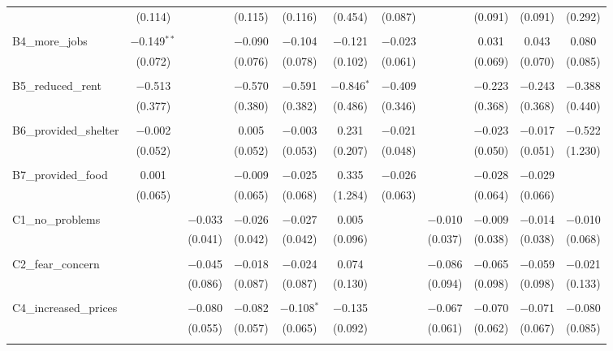 \begin{table}[H]
\begin{tabular}{@{\extracolsep{4pt}}lcccccccccc}
  & (0.114) &  & (0.115) & (0.116) & (0.454) & (0.087) &  & (0.091) & (0.091) & (0.292) \\ 
  & & & & & & & & & & \\ 
 B4\_more\_jobs & $-$0.149$^{**}$ &  & $-$0.090 & $-$0.104 & $-$0.121 & $-$0.023 &  & 0.031 & 0.043 & 0.080 \\ 
  & (0.072) &  & (0.076) & (0.078) & (0.102) & (0.061) &  & (0.069) & (0.070) & (0.085) \\ 
  & & & & & & & & & & \\ 
 B5\_reduced\_rent & $-$0.513 &  & $-$0.570 & $-$0.591 & $-$0.846$^{*}$ & $-$0.409 &  & $-$0.223 & $-$0.243 & $-$0.388 \\ 
  & (0.377) &  & (0.380) & (0.382) & (0.486) & (0.346) &  & (0.368) & (0.368) & (0.440) \\ 
  & & & & & & & & & & \\ 
 B6\_provided\_shelter & $-$0.002 &  & 0.005 & $-$0.003 & 0.231 & $-$0.021 &  & $-$0.023 & $-$0.017 & $-$0.522 \\ 
  & (0.052) &  & (0.052) & (0.053) & (0.207) & (0.048) &  & (0.050) & (0.051) & (1.230) \\ 
  & & & & & & & & & & \\ 
 B7\_provided\_food & 0.001 &  & $-$0.009 & $-$0.025 & 0.335 & $-$0.026 &  & $-$0.028 & $-$0.029 &  \\ 
  & (0.065) &  & (0.065) & (0.068) & (1.284) & (0.063) &  & (0.064) & (0.066) &  \\ 
  & & & & & & & & & & \\ 
 C1\_no\_problems &  & $-$0.033 & $-$0.026 & $-$0.027 & 0.005 &  & $-$0.010 & $-$0.009 & $-$0.014 & $-$0.010 \\ 
  &  & (0.041) & (0.042) & (0.042) & (0.096) &  & (0.037) & (0.038) & (0.038) & (0.068) \\ 
  & & & & & & & & & & \\ 
 C2\_fear\_concern &  & $-$0.045 & $-$0.018 & $-$0.024 & 0.074 &  & $-$0.086 & $-$0.065 & $-$0.059 & $-$0.021 \\ 
  &  & (0.086) & (0.087) & (0.087) & (0.130) &  & (0.094) & (0.098) & (0.098) & (0.133) \\ 
  & & & & & & & & & & \\ 
 C4\_increased\_prices &  & $-$0.080 & $-$0.082 & $-$0.108$^{*}$ & $-$0.135 &  & $-$0.067 & $-$0.070 & $-$0.071 & $-$0.080 \\ 
  &  & (0.055) & (0.057) & (0.065) & (0.092) &  & (0.061) & (0.062) & (0.067) & (0.085) \\ 
  & & & & & & & & & & \\ 

\end{tabular}
\end{table}
